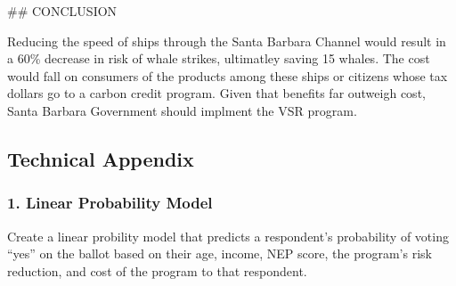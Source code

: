 \documentclass[10pt,]{article}
\begin{document}
\vspace{-15pt} \#\# CONCLUSION \vspace{-10pt}

Reducing the speed of ships through the Santa Barbara Channel would
result in a 60\% decrease in risk of whale strikes, ultimatley saving 15
whales. The cost would fall on consumers of the products among these
ships or citizens whose tax dollars go to a carbon credit program. Given
that benefits far outweigh cost, Santa Barbara Government should
implment the VSR program.

\newpage

\subsection{Technical Appendix}\label{technical-appendix}

\vspace{-10pt}

\subsubsection{1. Linear Probability
Model}\label{linear-probability-model}

Create a linear probility model that predicts a respondent's probability
of voting ``yes'' on the ballot based on their age, income, NEP score,
the program's risk reduction, and cost of the program to that
respondent.
\end{document}
